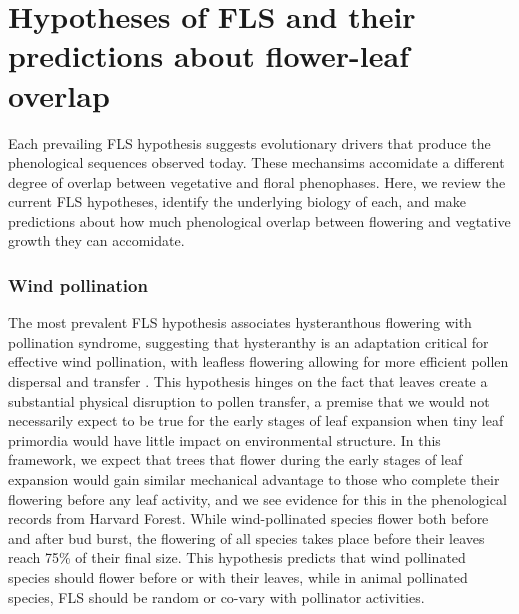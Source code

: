 \documentclass[12pt]{article}\usepackage[]{graphicx}\usepackage[]{color}
\begin{document}
\section*{Hypotheses of FLS and their predictions about flower-leaf overlap}
\indent \indent Each prevailing FLS hypothesis suggests evolutionary drivers that produce the phenological sequences observed today. These mechansims accomidate a different degree of overlap between vegetative and floral phenophases. Here, we review the current FLS hypotheses, identify the underlying biology of each, and make predictions about how much phenological overlap between flowering and vegtative growth they can accomidate.

\subsubsection*{ Wind pollination}
\indent\indent The most prevalent FLS hypothesis associates hysteranthous flowering with pollination syndrome, suggesting that hysteranthy is an adaptation critical for effective wind pollination, with leafless flowering allowing for more efficient pollen dispersal and transfer \citep{Whitehead1969, Spurr1980,Friedman2009}. %
 This hypothesis hinges on the fact that leaves create a substantial physical disruption to pollen transfer, a premise that we would not necessarily expect to be true for the early stages of leaf expansion when tiny leaf primordia would have little impact on environmental structure. In this framework, we expect that trees that flower during the early stages of leaf expansion would gain similar mechanical advantage to those who complete their flowering before any leaf activity, and we see evidence for this in the phenological records from Harvard Forest. While wind-pollinated species flower both before and after bud burst, the flowering of all species takes place before their leaves reach 75\% of their final size. This hypothesis predicts that wind pollinated species should flower before or with their leaves, while in animal pollinated species, FLS should be random or co-vary with pollinator activities.
\end{document}

